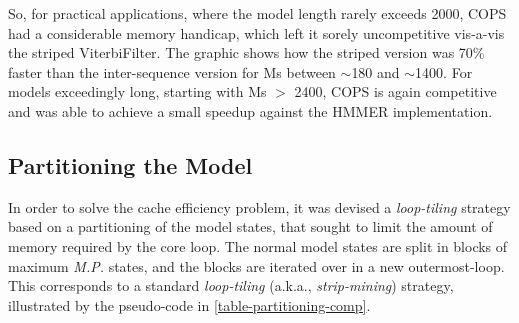 So, for practical applications, where the model length rarely exceeds 2000, COPS had a considerable memory handicap, which left it sorely uncompetitive vis-a-vis the striped ViterbiFilter. The graphic shows how the striped version was 70\% faster than the inter-sequence version for Ms between $\sim$180 and $\sim$1400. For models exceedingly long, starting with Ms $>$ 2400, COPS is again competitive and was able to achieve a small speedup against the HMMER implementation.





\subsection{Partitioning the Model}

In order to solve the cache efficiency problem, it was devised a \emph{loop-tiling} strategy based on a partitioning of the model states, that sought to limit the amount of memory required by the core loop. The normal model states are split in blocks of maximum \emph{M.P.} states, and the blocks are iterated over in a new outermost-loop. This corresponds to a standard \emph{loop-tiling} (a.k.a., \emph{strip-mining}) strategy, illustrated by the pseudo-code in \autoref{table-partitioning-comp}.

